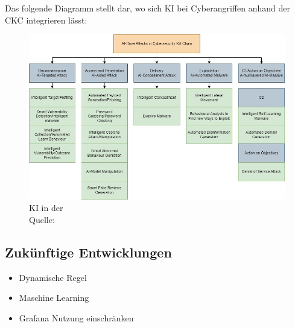 \newpage
Das folgende Diagramm stellt dar, wo sich \gls{KI} bei Cyberangriffen anhand der \gls{CKC} integrieren lässt:

\begin{figure}[H]
    \centering
    \includegraphics[width=1\textwidth]{assets//CKC_AI.jpg}
    \caption{\gls{KI} in der  \\Quelle: \citep{Guembe_AIDiagrammAngriff}}
    \centering
 \end{figure}
 

\subsection{Zukünftige Entwicklungen}
\begin{itemize}[noitemsep]
    \item Dynamische Regel
    \item Maschine Learning
    \item Grafana Nutzung einschränken
 \end{itemize}
 
